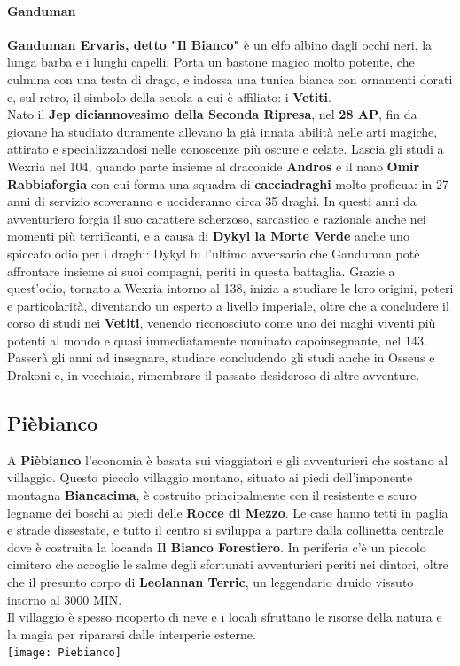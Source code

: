 \documentclass[10pt,twoside,onecolumn,openany]{book}
\begin{document}
\paragraph{Ganduman}
\textbf{Ganduman Ervaris, detto "Il Bianco"} è un elfo albino dagli occhi neri, la lunga barba e i lunghi capelli. Porta un bastone magico molto potente, che culmina con una testa di drago, e indossa una tunica bianca con ornamenti dorati e, sul retro, il simbolo della scuola a cui è affiliato: i \textbf{Vetiti}.\\
Nato il \textbf{Jep diciannovesimo della Seconda Ripresa}, nel \textbf{28 AP}, fin da giovane ha studiato duramente allevano la già innata abilità nelle arti magiche, attirato e specializzandosi nelle conoscenze più oscure e celate. Lascia gli studi a Wexria nel 104, quando parte insieme al draconide \textbf{Andros} e il nano \textbf{Omir Rabbiaforgia} con cui forma una squadra di \textbf{cacciadraghi} molto proficua: in 27 anni di servizio scoveranno e uccideranno circa 35 draghi. In questi anni da avventuriero forgia il suo carattere scherzoso, sarcastico e razionale anche nei momenti più terrificanti, e a causa di \textbf{Dykyl la Morte Verde} anche uno spiccato odio per i draghi: Dykyl fu l'ultimo avversario che Ganduman potè affrontare insieme ai suoi compagni, periti in questa battaglia. Grazie a quest'odio, tornato a Wexria intorno al 138, inizia a studiare le loro origini, poteri e particolarità, diventando un esperto a livello imperiale, oltre che a concludere il corso di studi nei \textbf{Vetiti}, venendo riconosciuto come uno dei maghi viventi più potenti al mondo e quasi immediatamente nominato capoinsegnante, nel 143.\\
Passerà gli anni ad insegnare, studiare concludendo gli studi anche in Osseus e Drakoni e, in vecchiaia, rimembrare il passato desideroso di altre avventure.
\newpage
\subsection{Pièbianco}
A \textbf{Pièbianco} l'economia è basata sui viaggiatori e gli avventurieri che sostano al villaggio. Questo piccolo villaggio montano, situato ai piedi dell'imponente montagna \textbf{Biancacima}, è costruito principalmente con il resistente e scuro legname dei boschi ai piedi delle \textbf{Rocce di Mezzo}. Le case hanno tetti in paglia e strade dissestate, e tutto il centro si sviluppa a partire dalla collinetta centrale dove è costruita la locanda \textbf{Il Bianco Forestiero}. In periferia c'è un piccolo cimitero che accoglie le salme degli sfortunati avventurieri periti nei dintori, oltre che il presunto corpo di \textbf{Leolannan Terric}, un leggendario druido vissuto intorno al 3000 MIN.\\
Il villaggio è spesso ricoperto di neve e i locali sfruttano le risorse della natura e la magia per ripararsi dalle interperie esterne.\\
\texttt{[image: Piebianco]}
\end{document}
